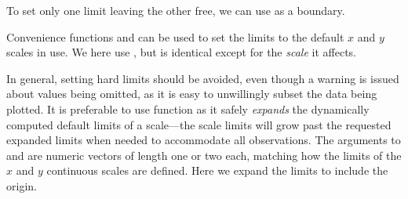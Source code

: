 \documentclass[krantz2]{krantz}\usepackage{knitr}
\begin{document}
To set only one limit leaving the other free, we can use  as a boundary.

\begin{knitrout}\footnotesize
{}\color{fgcolor}\begin{kframe}
\begin{alltt}
  \hlstd{(} \hlstd{=} \hlstd{(}\hlstd{,} \hlstd{))}
\end{alltt}
\end{kframe}
\end{knitrout}

Convenience functions  and  can be used to set the limits to the default $x$ and $y$ scales in use. We here use , but  is identical except for the \emph{scale} it affects.

\begin{knitrout}\footnotesize
{}\color{fgcolor}\begin{kframe}
\begin{alltt}
  \hlstd{(}\hlstd{,} \hlstd{)}
\end{alltt}
\end{kframe}
\end{knitrout}

In general, setting hard limits should be avoided, even though a warning is issued about  values being omitted, as it is easy to unwillingly subset the data being plotted.
It is preferable to use function  as it safely \emph{expands} the dynamically computed default limits of a scale---the scale limits will grow past the requested expanded limits when needed to accommodate all observations. The arguments to  and  are numeric vectors of length one or two each, matching how the limits of the $x$ and $y$ continuous scales are defined. Here we expand the limits to include the origin.
\end{document}
